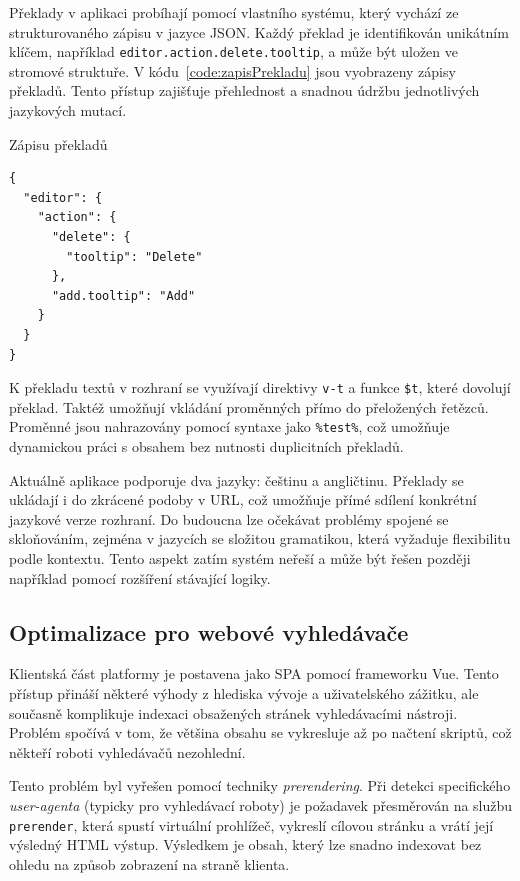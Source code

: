 Překlady v aplikaci probíhají pomocí vlastního systému, který vychází ze strukturovaného zápisu v jazyce JSON. 
Každý překlad je identifikován unikátním klíčem, například \texttt{editor.action.delete.tooltip}, a může být uložen ve stromové struktuře. 
V kódu~\ref{code:zapisPrekladu} jsou vyobrazeny zápisy překladů.
Tento přístup zajišťuje přehlednost a snadnou údržbu jednotlivých jazykových mutací.


\begin{listing}[ht!]
\caption{Zápisu překladů}\label{code:zapisPrekladu}
\begin{verbatim}
{
  "editor": {
    "action": {
      "delete": {
        "tooltip": "Delete"
      },
      "add.tooltip": "Add"
    }
  }
}
\end{verbatim}
\end{listing}

K překladu textů v rozhraní se využívají direktivy \texttt{v-t} a funkce \texttt{\$t}, které dovolují překlad.
Taktéž umožňují vkládání proměnných přímo do přeložených řetězců. 
Proměnné jsou nahrazovány pomocí syntaxe jako \texttt{\%test\%}, což umožňuje dynamickou práci s obsahem bez nutnosti duplicitních překladů.

Aktuálně aplikace podporuje dva jazyky: češtinu a angličtinu. 
Překlady se ukládají i do zkrácené podoby v URL, což umožňuje přímé sdílení konkrétní jazykové verze rozhraní. 
Do budoucna lze očekávat problémy spojené se skloňováním, zejména v jazycích se složitou gramatikou, která vyžaduje flexibilitu podle kontextu. 
Tento aspekt zatím systém neřeší a může být řešen později například pomocí rozšíření stávající logiky.

\subsection{Optimalizace pro webové vyhledávače}

Klientská část platformy je postavena jako SPA pomocí frameworku Vue. 
Tento přístup přináší některé výhody z hlediska vývoje a uživatelského zážitku, ale současně komplikuje indexaci obsažených stránek vyhledávacími nástroji. 
Problém spočívá v tom, že většina obsahu se vykresluje až po načtení skriptů, což někteří roboti vyhledávačů nezohlední.

Tento problém byl vyřešen pomocí techniky \textit{prerendering}.
Při detekci specifického \textit{user-agenta} (typicky pro vyhledávací roboty) je požadavek přesměrován na službu \texttt{prerender}, která spustí virtuální prohlížeč, vykreslí cílovou stránku a vrátí její výsledný HTML výstup.
Výsledkem je obsah, který lze snadno indexovat bez ohledu na způsob zobrazení na straně klienta.

